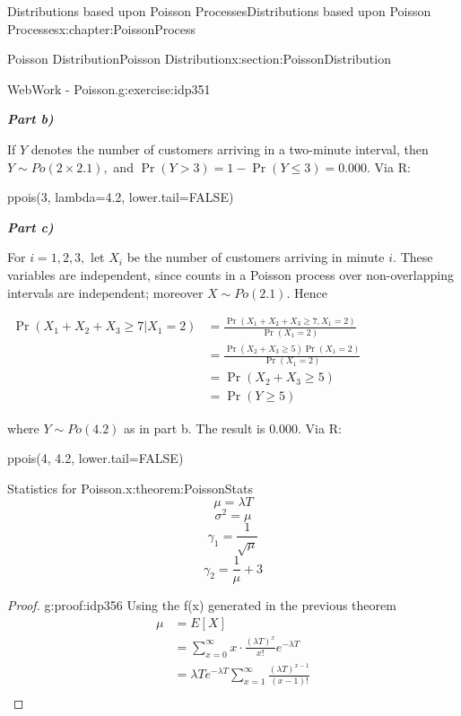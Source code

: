 \documentclass[oneside,10pt,]{book}
\newcommand{\alert}[1]{\textbf{\textit{#1}}}
\numberwithin{equation}{section}
\newcommand{\amp}{&}
\begin{document}
\begin{chapterptx}{Distributions based upon Poisson Processes}{}{Distributions based upon Poisson Processes}{}{}{x:chapter:PoissonProcess}
\begin{sectionptx}{Poisson Distribution}{}{Poisson Distribution}{}{}{x:section:PoissonDistribution}
\begin{inlineexercise}{WebWork - Poisson.}{g:exercise:idp351}
\par
\alert{Part b)}%
\par
If \(Y\) denotes the number of customers arriving in a two-minute interval, then \(Y \sim Po(2 \times 2.1),\) and \(\Pr(Y > 3) = 1 - \Pr(Y \leq 3) = 0.000.\) Via R:%
\par
ppois(3, lambda=4.2, lower.tail=FALSE)%
\par
\alert{Part c)}%
\par
For \(i = 1, 2, 3,\) let \(X_i\) be the number of customers arriving in minute \(i\). These variables are independent, since counts in a Poisson process over non-overlapping intervals are independent; moreover \(X \sim Po(2.1).\) Hence%
\par
\(\begin{align*} \Pr(X_1 + X_2 + X_3 \geq 7 | X_1 = 2) \amp = \frac{\Pr(X_1 + X_2 + X_3 \geq 7, X_1 = 2)}{\Pr(X_1 = 2)} \\ \amp = \frac{\Pr(X_2 + X_3 \geq 5) \Pr(X_1 = 2)}{\Pr(X_1 = 2)} \\ \amp = \Pr(X_2 + X_3 \geq 5) \\ \amp = \Pr(Y \geq 5) \end{align*}\)%
\par
where \(Y \sim Po(4.2)\) as in part b. The result is \(0.000.\) Via R:%
\par
ppois(4, 4.2, lower.tail=FALSE)%
\end{inlineexercise}%
\begin{theorem}{Statistics for Poisson.}{}{x:theorem:PoissonStats}%
%
\begin{equation*}
\mu = \lambda T
\end{equation*}
%
\begin{equation*}
\sigma^2 = \mu
\end{equation*}
%
\begin{equation*}
\gamma_1 = \frac{1}{\sqrt{\mu}}
\end{equation*}
%
\begin{equation*}
\gamma_2 = \frac{1}{\mu}+3
\end{equation*}
%
\end{theorem}
\begin{proof}{}{g:proof:idp356}
Using the f(x) generated in the previous theorem%
\begin{align*}
\mu & = E[X] \\
& = \sum_{x=0}^{\infty} x \cdot \frac{(\lambda T)^x}{x!} e^{-\lambda T}\\
& = \lambda T e^{-\lambda T} \sum_{x=1}^{\infty} \frac{(\lambda T)^{x-1}}{(x-1)!} \\

\end{align*}
\end{proof}
\end{sectionptx}
\end{chapterptx}
\end{document}
